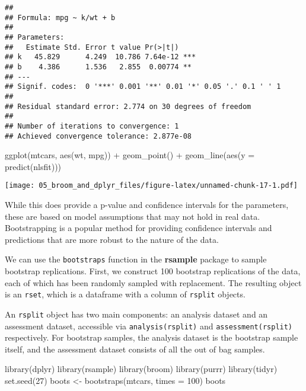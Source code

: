 \documentclass[
]{book}
\newenvironment{Shaded}{\begin{snugshade}}{\end{snugshade}}
\newcommand{\AttributeTok}[1]{\textcolor[rgb]{0.77,0.63,0.00}{#1}}
\newcommand{\DecValTok}[1]{\textcolor[rgb]{0.00,0.00,0.81}{#1}}
\newcommand{\FunctionTok}[1]{\textcolor[rgb]{0.00,0.00,0.00}{#1}}
\newcommand{\NormalTok}[1]{#1}
\newcommand{\OtherTok}[1]{\textcolor[rgb]{0.56,0.35,0.01}{#1}}
\newcommand{\SpecialCharTok}[1]{\textcolor[rgb]{0.00,0.00,0.00}{#1}}
\begin{document}
\begin{verbatim}
## 
## Formula: mpg ~ k/wt + b
## 
## Parameters:
##   Estimate Std. Error t value Pr(>|t|)    
## k   45.829      4.249  10.786 7.64e-12 ***
## b    4.386      1.536   2.855  0.00774 ** 
## ---
## Signif. codes:  0 '***' 0.001 '**' 0.01 '*' 0.05 '.' 0.1 ' ' 1
## 
## Residual standard error: 2.774 on 30 degrees of freedom
## 
## Number of iterations to convergence: 1 
## Achieved convergence tolerance: 2.877e-08
\end{verbatim}

\begin{Shaded}
\begin{Highlighting}[]
\FunctionTok{ggplot}\NormalTok{(mtcars, }\FunctionTok{aes}\NormalTok{(wt, mpg)) }\SpecialCharTok{+}
    \FunctionTok{geom\_point}\NormalTok{() }\SpecialCharTok{+}
    \FunctionTok{geom\_line}\NormalTok{(}\FunctionTok{aes}\NormalTok{(}\AttributeTok{y =} \FunctionTok{predict}\NormalTok{(nlsfit)))}
\end{Highlighting}
\end{Shaded}

\texttt{[image: 05\_broom\_and\_dplyr\_files/figure-latex/unnamed-chunk-17-1.pdf]}

While this does provide a p-value and confidence intervals for the parameters, these are based on model assumptions that may not hold in real data. Bootstrapping is a popular method for providing confidence intervals and predictions that are more robust to the nature of the data.

We can use the \texttt{bootstraps} function in the \textbf{rsample} package to sample bootstrap replications. First, we construct 100 bootstrap replications of the data, each of which has been randomly sampled with replacement. The resulting object is an \texttt{rset}, which is a dataframe with a column of \texttt{rsplit} objects.

An \texttt{rsplit} object has two main components: an analysis dataset and an assessment dataset, accessible via \texttt{analysis(rsplit)} and \texttt{assessment(rsplit)} respectively. For bootstrap samples, the analysis dataset is the bootstrap sample itself, and the assessment dataset consists of all the out of bag samples.

\begin{Shaded}
\begin{Highlighting}[]
\FunctionTok{library}\NormalTok{(dplyr)}
\FunctionTok{library}\NormalTok{(rsample)}
\FunctionTok{library}\NormalTok{(broom)}
\FunctionTok{library}\NormalTok{(purrr)}
\FunctionTok{library}\NormalTok{(tidyr)}
\FunctionTok{set.seed}\NormalTok{(}\DecValTok{27}\NormalTok{)}
\NormalTok{boots }\OtherTok{\textless{}{-}} \FunctionTok{bootstraps}\NormalTok{(mtcars, }\AttributeTok{times =} \DecValTok{100}\NormalTok{)}
\NormalTok{boots}
\end{Highlighting}
\end{Shaded}
\end{document}
